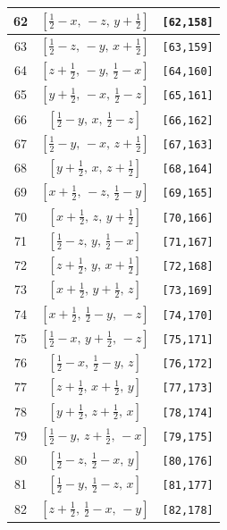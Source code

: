 \documentclass[fleqn,8pt]{jsarticle}
\begin{document}
\begin{longtable}{ccc}
62 & $\left[ \frac{1}{2} - x,\, - z,\, y + \frac{1}{2} \right]$ & {\tt [62,158]} \\ \hline
63 & $\left[ \frac{1}{2} - z,\, - y,\, x + \frac{1}{2} \right]$ & {\tt [63,159]} \\ \hline
64 & $\left[ z + \frac{1}{2},\, - y,\, \frac{1}{2} - x \right]$ & {\tt [64,160]} \\ \hline
65 & $\left[ y + \frac{1}{2},\, - x,\, \frac{1}{2} - z \right]$ & {\tt [65,161]} \\ \hline
66 & $\left[ \frac{1}{2} - y,\, x,\, \frac{1}{2} - z \right]$ & {\tt [66,162]} \\ \hline
67 & $\left[ \frac{1}{2} - y,\, - x,\, z + \frac{1}{2} \right]$ & {\tt [67,163]} \\ \hline
68 & $\left[ y + \frac{1}{2},\, x,\, z + \frac{1}{2} \right]$ & {\tt [68,164]} \\ \hline
69 & $\left[ x + \frac{1}{2},\, - z,\, \frac{1}{2} - y \right]$ & {\tt [69,165]} \\ \hline
70 & $\left[ x + \frac{1}{2},\, z,\, y + \frac{1}{2} \right]$ & {\tt [70,166]} \\ \hline
71 & $\left[ \frac{1}{2} - z,\, y,\, \frac{1}{2} - x \right]$ & {\tt [71,167]} \\ \hline
72 & $\left[ z + \frac{1}{2},\, y,\, x + \frac{1}{2} \right]$ & {\tt [72,168]} \\ \hline
73 & $\left[ x + \frac{1}{2},\, y + \frac{1}{2},\, z \right]$ & {\tt [73,169]} \\ \hline
74 & $\left[ x + \frac{1}{2},\, \frac{1}{2} - y,\, - z \right]$ & {\tt [74,170]} \\ \hline
75 & $\left[ \frac{1}{2} - x,\, y + \frac{1}{2},\, - z \right]$ & {\tt [75,171]} \\ \hline
76 & $\left[ \frac{1}{2} - x,\, \frac{1}{2} - y,\, z \right]$ & {\tt [76,172]} \\ \hline
77 & $\left[ z + \frac{1}{2},\, x + \frac{1}{2},\, y \right]$ & {\tt [77,173]} \\ \hline
78 & $\left[ y + \frac{1}{2},\, z + \frac{1}{2},\, x \right]$ & {\tt [78,174]} \\ \hline
79 & $\left[ \frac{1}{2} - y,\, z + \frac{1}{2},\, - x \right]$ & {\tt [79,175]} \\ \hline
80 & $\left[ \frac{1}{2} - z,\, \frac{1}{2} - x,\, y \right]$ & {\tt [80,176]} \\ \hline
81 & $\left[ \frac{1}{2} - y,\, \frac{1}{2} - z,\, x \right]$ & {\tt [81,177]} \\ \hline
82 & $\left[ z + \frac{1}{2},\, \frac{1}{2} - x,\, - y \right]$ & {\tt [82,178]} \\ \hline

\end{longtable}
\end{document}
